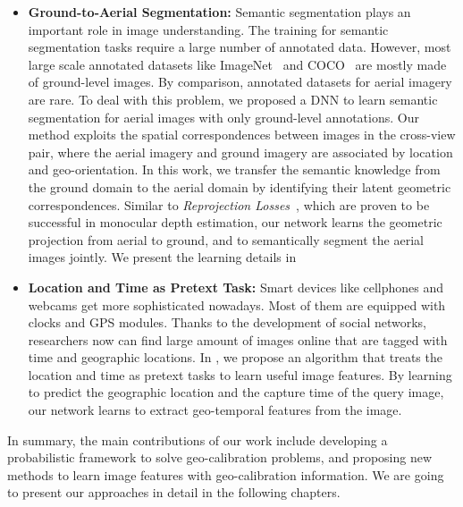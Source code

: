 \begin{itemize}[noitemsep]
  \item \textbf{Ground-to-Aerial Segmentation:}
  Semantic segmentation plays an important role in image understanding.
  The training for semantic segmentation tasks require a large number
  of annotated data.
  However, most large scale annotated datasets like ImageNet~\cite{ILSVRC15}
  and COCO~\cite{lin2014microsoft} are mostly made of ground-level
  images. By comparison, annotated datasets for aerial imagery are rare.
  To deal with this problem, we proposed a
  DNN to learn semantic segmentation for aerial images with only
  ground-level annotations. Our method exploits the spatial
  correspondences between images in the cross-view pair, where the
  aerial imagery and ground imagery are associated by location and
  geo-orientation.
  In this work, we transfer the semantic knowledge from the
  ground domain to the aerial domain by identifying their latent
  geometric correspondences. Similar to {\em
  Reprojection Losses}~\cite{garg2016unsupervised,
  godard2017unsupervised,zhou2017unsupervised, yan2016perspective},
  which are proven to be successful in monocular depth estimation,
  our network learns the geometric projection from aerial to ground, and
  to semantically segment the aerial images jointly.
  We present the learning details in 
  \newline

  \item \textbf{Location and Time as Pretext Task:}
  Smart devices like cellphones and webcams get more sophisticated
  nowadays. Most of them are equipped with clocks and GPS modules. Thanks to
  the development of social networks, researchers now can find
  large amount of images online that are tagged with time and
  geographic locations. In , we propose an
  algorithm that treats the location and time as pretext tasks to learn
  useful image features.  By learning to predict the geographic location
  and the capture time of the query image, our network learns to extract
  geo-temporal features from the image.

\end{itemize}


In summary, the main contributions of our work include developing a
probabilistic framework to solve geo-calibration problems, and
proposing new methods to learn image features with geo-calibration
information. We are going to present our approaches in detail in the
following chapters.
